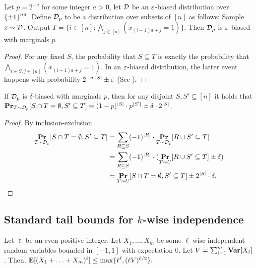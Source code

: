 \begin{claim}\label{claim:sampling-t}
Let $p = 2^{-a}$ for some integer $a>0$, 
let ${\mathcal{D}}$ be an $\varepsilon$-biased distribution over ${\{\pm1\}}^{na}$.
Define ${\mathcal{D}}_p$ to be a distribution over subsets of $[n]$ as follows:
Sample $x\sim {\mathcal{D}}$. 
Output 
$T = 
\{i\in [n]: \bigwedge_{j\in [a]} (x_{(i-1)a + j} = 1)\}$.
Then ${\mathcal{D}}_p$ is $\varepsilon$-biased with marginals $p$.
\end{claim}
\begin{proof}
For any fixed $S$, 
	the probability that $S \subseteq T$ is exactly the probability that $\bigwedge_{i\in S, j\in [a]} (x_{(i-1)a + j} = 1)$.
	In an $\varepsilon$-biased distribution, the latter event happens with probability $2^{-a\cdot |S|} \pm \varepsilon$ (See \cite{AlonGHP92}).
\end{proof}



\begin{claim}\label{claim:inclusion-exclusion}
If ${\mathcal{D}}_p$ is $\delta$-biased with marginals $p$, then for any disjoint $S,S'\subseteq [n]$ it holds that 
$\mathop{\bf Pr\/}_{T\sim {\mathcal{D}}_p}[S \cap T = \emptyset, S' \subseteq T] = (1-p)^{|S|}\cdot p^{|S'|} \pm \delta	\cdot 2^{|S|}$.
\end{claim}
\begin{proof}
	By inclusion-exclusion 
	\begin{align*}\mathop{\bf Pr\/}_{T \sim {\mathcal{D}}_p}[S \cap T = \emptyset, S' \subseteq T] &= \sum_{R \subseteq S} (-1)^{|R|} \cdot \mathop{\bf Pr\/}_{T \sim {\mathcal{D}}_p}[R \cup S' \subseteq T] \\
	&= \sum_{R \subseteq S} (-1)^{|R|} \cdot (\mathop{\bf Pr\/}_{T \sim U}[R \cup S' \subseteq T] \pm \delta)\\
	&= \mathop{\bf Pr\/}_{T \sim U}[S \cap T = \emptyset, S' \subseteq T] \pm 2^{|S|}\cdot \delta.\qedhere\end{align*}
\end{proof}


\subsection{Standard tail bounds for $k$-wise independence}

\begin{lemma}
\label{lemma:tail_bounds}
Let $\ell$ be an even positive integer.
	Let $X_1, \ldots, X_m$ be some $\ell$-wise independent random variables bounded in $[-1,1]$ with expectation $0$.
	Let $V = \sum_{i=1}^{m}{\mathop{\bf Var\/}}[X_i]$.
	Then,
	$\mathop{\bf E\/}[(X_1 + \ldots +X_m)^{\ell}] \le \max\{\ell^\ell, (\ell V)^{\ell/2}\}.$
\end{lemma}


